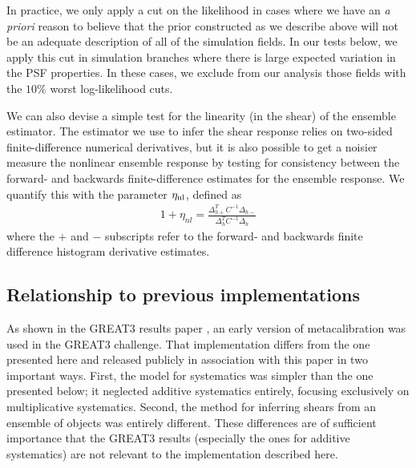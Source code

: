 \documentclass[iop]{emulateapj}
\newcommand\rmcomment[1]{\textcolor{red}{(RM: #1)}}
\begin{document}
In practice, we only apply a cut on the likelihood in cases where we have an {\it a
  priori} reason to believe that the prior constructed as we describe
above will not be an adequate description of all of the simulation
fields. In our tests below, we apply this cut in simulation branches
where there is large expected variation in the PSF properties. In
these cases, we exclude from our analysis those fields with the $10\%$
worst log-likelihood cuts.



We can also devise a simple test for the linearity (in the shear) of
the ensemble estimator. The estimator we use to infer the shear
response relies on two-sided finite-difference numerical derivatives,
but it is also possible to get a noisier measure the nonlinear
ensemble response by testing for consistency between the forward- and
backwards finite-difference estimates for the ensemble response. We
quantify this with the parameter $\eta_{\rm nl}$, defined as
\begin{align}
1+\eta_{nl} = \frac{\Delta_{h+}^T C^{-1} \Delta_{h-}}{\Delta_{h}^TC^{-1}\Delta_{h}}
\end{align}
where the $+$ and $-$ subscripts refer to the forward- and backwards
finite difference histogram derivative estimates.

\subsection{Relationship to previous implementations}

As shown in the GREAT3 results paper \citep{2015MNRAS.450.2963M}, an
early version of metacalibration was used in the GREAT3 challenge.
That implementation differs from the one presented here and released
publicly in association with this paper in two important ways.  First,
the model for systematics was simpler than the one presented below; it
neglected additive systematics entirely, focusing exclusively on
multiplicative systematics. Second, the method for inferring shears
from an ensemble of objects was entirely different.  These differences
are of sufficient importance that the GREAT3 results (especially the
ones for additive systematics) are not relevant to the implementation
described here.
\end{document}
